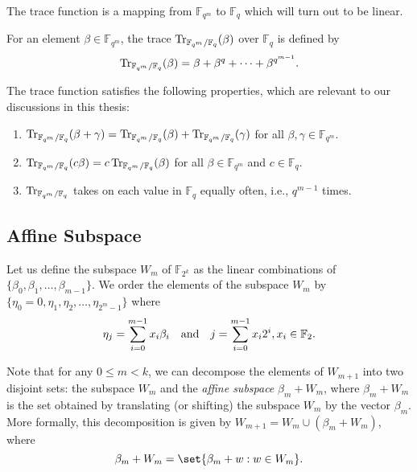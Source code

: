 The trace function is a mapping from $\mathbb{F}_{q^m}$ to $\mathbb{F}_{q}$ which will turn out to be linear.

\begin{definition}
	For an element $\beta \in \mathbb{F}_{q^m}$, the trace $\operatorname{Tr}_{\mathbb{F}_{q^m}/\mathbb{F}_{q}}(\beta)$ over $\mathbb{F}_{q}$ is defined by
	\[
	\operatorname{Tr}_{\mathbb{F}_{q^m}/\mathbb{F}_{q}}(\beta) = \beta + \beta^q + \cdots + \beta^{q^{m-1}}.
	\]
\end{definition}

The trace function satisfies the following properties, which are relevant to our discussions in this thesis:

\begin{enumerate}[label=(\roman*)]
	\item $\operatorname{Tr}_{\mathbb{F}_{q^m}/\mathbb{F}_{q}}(\beta+\gamma)= \operatorname{Tr}_{\mathbb{F}_{q^m}/\mathbb{F}_{q}}(\beta)+\operatorname{Tr}_{\mathbb{F}_{q^m}/\mathbb{F}_{q}}(\gamma)$ for all $\beta,\gamma \in \mathbb{F}_{q^m}$.
	
	\item $\operatorname{Tr}_{\mathbb{F}_{q^m}/\mathbb{F}_{q}}(c\beta)= c\operatorname{Tr}_{\mathbb{F}_{q^m}/\mathbb{F}_{q}}(\beta)$ for all $\beta \in \mathbb{F}_{q^m}$ and $c \in \mathbb{F}_{q}$.
	
	\item $\operatorname{Tr}_{\mathbb{F}_{q^m}/\mathbb{F}_{q}}$ takes on each value in $\mathbb{F}_{q}$ equally often, i.e., $q^{m-1}$ times.\label{Trace-Property3}
\end{enumerate}



	
\subsection{Affine Subspace}
Let us define the subspace $W_m$ of $\mathbb{F}_{2^k}$ as the linear combinations of $\{\beta_0, \beta_1, \ldots, \beta_{m-1}\}$. We order the elements of the subspace $W_m$ by $\{\eta_0=0, \eta_1, \eta_2, \dots, \eta_{2^m-1}\}$ where
\[
\eta_j = \sum_{i=0}^{m-1} x_i \beta_i \quad \text{and} \quad j=\sum_{i=0}^{m-1} x_i 2^i, x_i\in {\mathbb F}_2.
\]

Note that for any $0 \leq m < k$, we can decompose the elements of $W_{m+1}$ into two disjoint sets: the subspace $W_m$ and the \textit{affine subspace} $\beta_m + W_m$, where $\beta_m + W_m$ is the set obtained by translating (or shifting) the subspace $W_m$ by the vector $\beta_m$. More formally, this decomposition is given by $W_{m+1} = W_m \cup (\beta_m + W_m)$, where \[\beta_m + W_m = \set{\beta_m + w: w \in W_m} .\]

